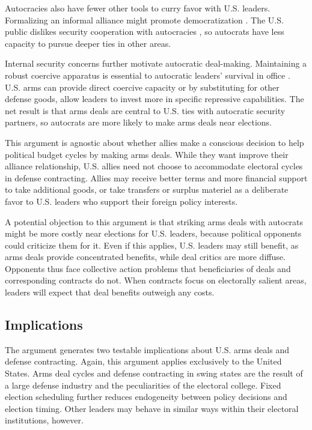 \documentclass[12pt]{article}
\begin{document}
Autocracies also have fewer other tools to curry favor with U.S. leaders.
Formalizing an informal alliance might promote democratization \citep{GiblerWolford2006, Warren2016}.
The U.S. public dislikes security cooperation with autocracies \citep{Alley2022}, so autocrats have less capacity to pursue deeper ties in other areas. 

Internal security concerns further motivate autocratic deal-making. 
Maintaining a robust coercive apparatus is essential to autocratic leaders' survival in office \citep{Boix2008}. 
U.S. arms can provide direct coercive capacity or by substituting for other defense goods, allow leaders to invest more in specific repressive capabilities. 
The net result is that arms deals are central to U.S. ties with autocratic security partners, so autocrats are more likely to make arms deals near elections.



This argument is agnostic about whether allies make a conscious decision to help political budget cycles by making arms deals.
While they want improve their alliance relationship, U.S. allies need not choose to accommodate electoral cycles in defense contracting.
Allies may receive better terms and more financial support to take additional goods, or take transfers or surplus materiel as a deliberate favor to U.S. leaders who support their foreign policy interests. 


A potential objection to this argument is that striking arms deals with autocrats might be more costly near elections for U.S. leaders, because political opponents could criticize them for it. 
Even if this applies, U.S. leaders may still benefit, as arms deals provide concentrated benefits, while deal critics are more diffuse.
Opponents thus face collective action problems that beneficiaries of deals and corresponding contracts do not. 
When contracts focus on electorally salient areas, leaders will expect that deal benefits outweigh any costs. 



\subsection{Implications}


The argument generates two testable implications about U.S. arms deals and defense contracting. 
Again, this argument applies exclusively to the United States.  
Arms deal cycles and defense contracting in swing states are the result of a large defense industry and the peculiarities of the electoral college. 
Fixed election scheduling further reduces endogeneity between policy decisions and election timing. 
Other leaders may behave in similar ways within their electoral institutions, however. 
\end{document}
